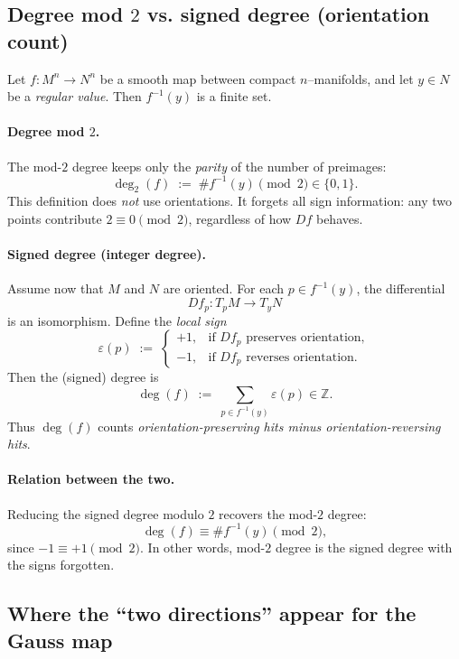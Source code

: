 \documentclass[12pt,a4paper]{article}
\theoremstyle{plain}
\theoremstyle{definition}      %
\begin{document}
	
	\subsection*{Degree mod $2$ vs. signed degree (orientation count)}
	
	Let $f\colon M^n\to N^n$ be a smooth map between compact $n$--manifolds, and let
	$y\in N$ be a \emph{regular value}. Then $f^{-1}(y)$ is a finite set.
	
	\paragraph{Degree mod $2$.}
	The mod-$2$ degree keeps only the \emph{parity} of the number of preimages:
	\[
	\deg_2(f)\;:=\;\#f^{-1}(y)\pmod 2\in\{0,1\}.
	\]
	This definition does \emph{not} use orientations. It forgets all sign information:
	any two points contribute $2\equiv 0\pmod 2$, regardless of how $Df$ behaves.
	
	\paragraph{Signed degree (integer degree).}
	Assume now that $M$ and $N$ are oriented. For each $p\in f^{-1}(y)$,
	the differential
	\[
	Df_p\colon T_pM\longrightarrow T_yN
	\]
	is an isomorphism. Define the \emph{local sign}
	\[
	\varepsilon(p)\;:=\;
	\begin{cases}
		+1, & \text{if } Df_p \text{ preserves orientation},\\[2pt]
		-1, & \text{if } Df_p \text{ reverses orientation}.
	\end{cases}
	\]
	Then the (signed) degree is
	\[
	\deg(f)\;:=\;\sum_{p\in f^{-1}(y)}\varepsilon(p)\in\mathbb Z.
	\]
	Thus $\deg(f)$ counts \emph{orientation-preserving hits minus orientation-reversing hits}.
	
	\paragraph{Relation between the two.}
	Reducing the signed degree modulo $2$ recovers the mod-$2$ degree:
	\[
	\deg(f)\equiv \#f^{-1}(y)\pmod 2,
	\]
	since $-1\equiv +1\pmod 2$. In other words, mod-$2$ degree is the signed degree
	with the signs forgotten.
	
	\subsection*{Where the ``two directions'' appear for the Gauss map}
	
\end{document}
